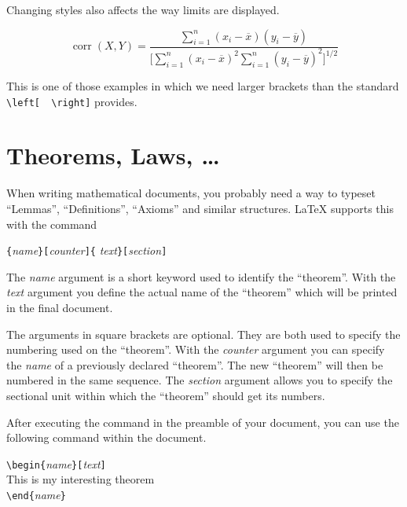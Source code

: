 Changing styles also affects the way limits are displayed.
\begin{example}
\begin{displaymath}
\mathop{\mathrm{corr}}(X,Y)= 
 \frac{\displaystyle 
   \sum_{i=1}^n(x_i-\overline x)
   (y_i-\overline y)} 
  {\displaystyle\biggl[
 \sum_{i=1}^n(x_i-\overline x)^2
\sum_{i=1}^n(y_i-\overline y)^2
\biggr]^{1/2}}
\end{displaymath}    
\end{example}

\noindent This is one of those examples in which we need larger
brackets than the standard \verb|\left[  \right]| provides.


\section{Theorems, Laws, \ldots}

When writing mathematical documents, you probably need a way to
typeset ``Lemmas'', ``Definitions'', ``Axioms'' and similar
structures. \LaTeX{} supports this with the command
\begin{lscommand}
\verb|{|\emph{name}\verb|}[|\emph{counter}\verb|]{|%
         \emph{text}\verb|}[|\emph{section}\verb|]|
\end{lscommand}
The \emph{name} argument is a short keyword used to identify the
``theorem''. With the \emph{text} argument you define the actual name
of the ``theorem'' which will be printed in the final document.

The arguments in square brackets are optional. They are both used to
specify the numbering used on the ``theorem''. With the \emph{counter}
argument you can specify the \emph{name} of a previously declared
``theorem''. The new ``theorem'' will then be numbered in the same
sequence.  The \emph{section} argument allows you to specify the
sectional unit within which the ``theorem'' should get its numbers.

After executing the  command in the preamble of your
document, you can use the following command within the document.
\begin{code}
\verb|\begin{|\emph{name}\verb|}[|\emph{text}\verb|]|\\
This is my interesting theorem\\
\verb|\end{|\emph{name}\verb|}|     
\end{code}


